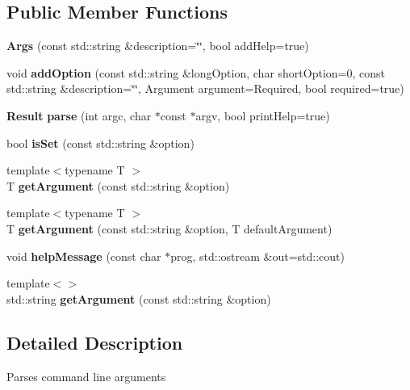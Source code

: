\subsection*{Public Member Functions}
\begin{DoxyCompactItemize}
\item 
{\bfseries Args} (const std\-::string \&description=\char`\"{}\char`\"{}, bool add\-Help=true)\label{classtools_1_1Args_ac990064dc296955154be98d98acd46b9}

\item 
void {\bfseries add\-Option} (const std\-::string \&long\-Option, char short\-Option=0, const std\-::string \&description=\char`\"{}\char`\"{}, Argument argument=Required, bool required=true)\label{classtools_1_1Args_a10d5693fa13e60f9da62dcd8696c150d}

\item 
{\bf Result} {\bf parse} (int argc, char $\ast$const $\ast$argv, bool print\-Help=true)
\item 
bool {\bfseries is\-Set} (const std\-::string \&option)\label{classtools_1_1Args_a73558f89ba2c7592c0bbb5c29bee228c}

\item 
{\footnotesize template$<$typename T $>$ }\\T {\bfseries get\-Argument} (const std\-::string \&option)\label{classtools_1_1Args_ab21287411ac81cd228184ee520267851}

\item 
{\footnotesize template$<$typename T $>$ }\\T {\bfseries get\-Argument} (const std\-::string \&option, T default\-Argument)\label{classtools_1_1Args_a6247cd94f3bc79ce2a120777caeaea7c}

\item 
void {\bfseries help\-Message} (const char $\ast$prog, std\-::ostream \&out=std\-::cout)\label{classtools_1_1Args_a8e805f57e66ed5407fe3762b8409d685}

\item 
{\footnotesize template$<$$>$ }\\std\-::string {\bfseries get\-Argument} (const std\-::string \&option)\label{classtools_1_1Args_ab9c570cfa217f4694ac801de1e835351}

\end{DoxyCompactItemize}


\subsection{Detailed Description}
Parses command line arguments 

